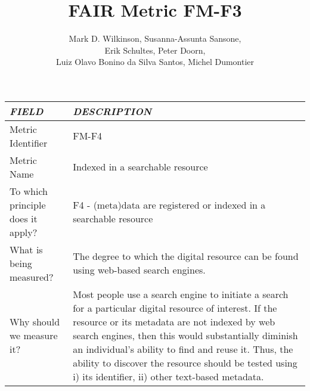 \documentclass[english]{article}
\begin{document}
\title{FAIR Metric FM-F3}

\author{Mark D. Wilkinson, Susanna-Assunta Sansone, \\Erik Schultes, Peter Doorn,\\ 
Luiz Olavo Bonino da Silva Santos, Michel Dumontier}

\maketitle

\newpage





\begin{longtable}{|p{5cm}|p{9cm}|}


\hline
\emph{FIELD} & \emph{DESCRIPTION} \\
\hline
Metric Identifier &   FM-F4
 \\


\hline
Metric Name &   


Indexed in a searchable resource



 \\



\hline
To which principle does it apply? &   

F4 - (meta)data are registered or indexed in a searchable resource

\\



\hline
What is being measured? & 



The degree to which the digital resource can be found using  web-based search engines.


\\



\hline
Why should we measure it? & 




Most people use a search engine to initiate a search for a particular digital resource of interest. If the resource or its metadata are not indexed by web search engines, then this would substantially diminish an individual’s ability to find and reuse it. Thus, the ability to discover the resource should be tested using i) its identifier, ii) other text-based metadata. 


  
\\




\end{longtable}
\end{document}
